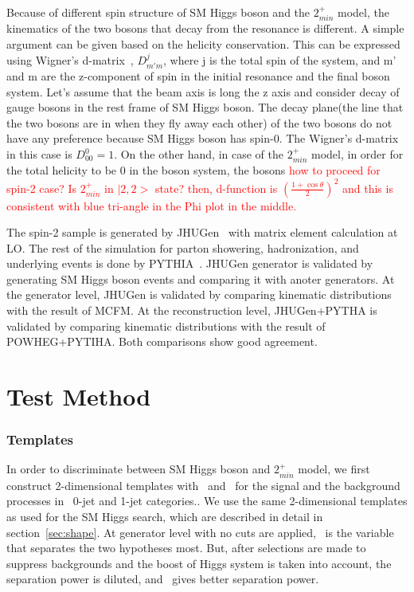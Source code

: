 Because of different spin structure of SM Higgs boson and the $2_{min}^+$ model, 
the kinematics of the two bosons that decay from the resonance is different. 
A simple argument can be given based on the helicity conservation. 
This can be expressed using Wigner's d-matrix~\cite{}, $D^{j}_{m'm}$, where 
j is the total spin of the system, and  m' and m are the z-component of spin 
in the initial resonance and the final boson system. 
Let's assume that the beam axis is long the z axis and consider 
decay of gauge bosons in the rest frame of SM Higgs boson. 
The decay plane(the line that the two bosons are in when they fly away each other) 
of the two bosons do not have any preference because SM Higgs boson has spin-0. 
The Wigner's d-matrix in this case is $D_{00}^{0} = 1$. 
On the other hand, in case of the $2_{min}^+$ model, in order for the 
total helicity to be 0 in the boson system, the bosons   
\textcolor{red}{how to proceed for spin-2 case? Is $2_{min}^+$ in $|2,2>$ state?
then, d-function is $\left( \frac{1+\cos \theta}{2} \right)^2$ and this is 
consistent with blue tri-angle in the Phi plot in the middle.} 

The spin-2 sample is generated by JHUGen~\cite{} with matrix element calculation at LO. 
The rest of the simulation for parton showering, hadronization, and underlying events 
is done by PYTHIA~\cite{}. JHUGen generator is validated by generating SM Higgs boson
events and comparing it with anoter generators. 
At the generator level, JHUGen is validated by comparing kinematic distributions 
with the result of MCFM. 
At the reconstruction level, JHUGen+PYTHA is validated by comparing kinematic 
distributions with the result of POWHEG+PYTIHA.
Both comparisons show good agreement. 

\section{Test Method}

\subsubsection{Templates}

In order to discriminate between SM Higgs boson and $2_{min}^+$ model,
we first construct 2-dimensional templates with \mT\ and \mll\ for the signal 
and the background processes in \DF\ 0-jet and 1-jet categories..
We use the same 2-dimensional templates 
as used for the SM Higgs search, which are described in detail in 
section~\ref{sec:shape}. At generator level with no cuts are applied, 
\delphill\ is the variable that separates the two hypotheses most. But, after 
selections are made to suppress backgrounds and the boost of Higgs system 
is taken into account, the separation power is diluted, and \mll\ gives better 
separation power.

